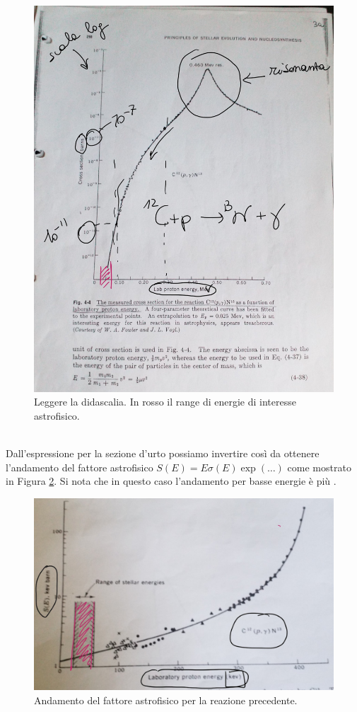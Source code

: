 \begin{figure}[!h]
    \centering
    \includegraphics[scale=0.2]{Immagini/0322_crosssection.png}
    \caption{Leggere la didascalia. In rosso il range di energie di interesse astrofisico.}
    \label{0322_cross}
\end{figure}\\
\noindent Dall'espressione per la sezione d'urto possiamo invertire così da ottenere l'andamento del fattore astrofisico $S(E) = E \sigma(E)\exp(\dots)$ come mostrato in Figura \ref{0322_fatastr}. Si nota che in questo caso l'andamento per basse energie è più .

\begin{figure}[h]
    \centering
    \includegraphics[scale=0.3]{Immagini/0322_fattoreastr.png}
    \caption{Andamento del fattore astrofisico per la reazione precedente.}
    \label{0322_fatastr}
\end{figure}

